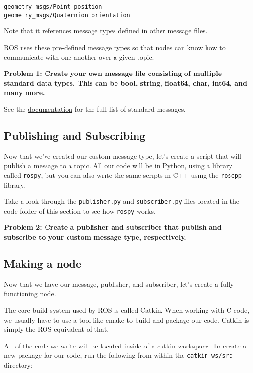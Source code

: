 \begin{lstlisting}
geometry_msgs/Point position
geometry_msgs/Quaternion orientation
\end{lstlisting}

Note that it references message types defined in other message files.

ROS uses these pre-defined message types so that nodes can know how to communicate with one another over a given topic.

\textbf{Problem 1: Create your own message file consisting of multiple standard data types. This can be bool, string, float64, char, int64, and many more.}

See the \href{http://docs.ros.org/kinetic/api/std_msgs/html/index-msg.html}{documentation} for the full list of standard messages.


\subsection{Publishing and Subscribing}
Now that we've created our custom message type, let's create a script that will publish a message to a topic. All our code will be in Python, using a library called \texttt{rospy}, but you can also write the same scripts in C++ using the \texttt{roscpp} library. 

Take a look through the \texttt{publisher.py} and \texttt{subscriber.py} files located in the code folder of this section to see how \texttt{rospy} works.

\textbf{Problem 2: Create a publisher and subscriber that publish and subscribe to your custom message type, respectively.}


\subsection{Making a node}
Now that we have our message, publisher, and subscriber, let's create a fully functioning node.

The core build system used by ROS is called Catkin. When working with C code, we usually have to use a tool like cmake to build and package our code. Catkin is simply the ROS equivalent of that. 

All of the code we write will be located inside of a catkin workspace. To create a new package for our code, run the following from within the \texttt{catkin\_ws/src} directory:

